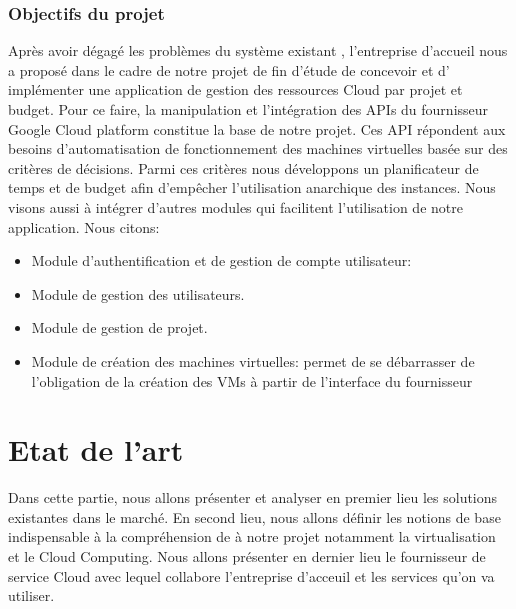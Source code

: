 \subsubsection{Objectifs du projet }
Après avoir dégagé  
les  problèmes du système existant , l'entreprise d'accueil nous a proposé dans le cadre de notre projet de fin d'étude de  concevoir  et d' implémenter  une  application  de  gestion  des  ressources 
Cloud par projet et budget. Pour ce faire, la manipulation et  l'intégration des APIs  du 
fournisseur Google Cloud platform constitue la base de notre projet. Ces API  répondent aux besoins d'automatisation de fonctionnement des machines virtuelles basée  sur des critères de décisions. Parmi ces critères nous développons un planificateur  
de temps et de budget afin 
d'empêcher l'utilisation anarchique des instances.
 Nous visons aussi à intégrer d'autres modules qui facilitent l'utilisation de notre application. Nous citons: 
 \begin{itemize}
 	\item 	Module d'authentification et de gestion de compte utilisateur:
 	\item 	Module de gestion des utilisateurs.
 	\item 	Module de gestion de projet.
 	\item 	Module de création des machines virtuelles: permet de se débarrasser de l'obligation de la création des VMs à partir de l'interface du fournisseur 
 	
 \end{itemize}

\section{Etat de l'art}
Dans  cette  partie,  nous  allons  présenter  et  analyser en premier lieu les  solutions  existantes  dans  le 
marché. En second lieu, nous allons définir les notions de base indispensable à la compréhension de à notre projet notamment  la  virtualisation et le  Cloud 
Computing. Nous allons présenter en dernier lieu le  fournisseur de service Cloud avec lequel collabore l'entreprise d'acceuil  et les  services  qu'on  va  utiliser. 


